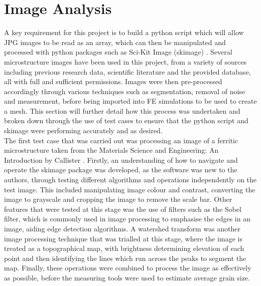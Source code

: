 \documentclass[\report.tex]{subfiles}
\begin{document}
\section{Image Analysis}
\noindent A key requirement for this project is to build a python script which will allow JPG images to be read as an array, which can then be manipulated and processed with python packages such as Sci-Kit Image (skimage) \cite{scikitimage}. Several microstructure images have been used in this project, from a variety of sources including previous research data, scientific literature and the provided database, all with full and sufficient permissions. Images were then pre-processed accordingly through various techniques such as segmentation, removal of noise and measurement, before being imported into FE simulations to be used to create a mesh. This section will further detail how this process was undertaken and broken down through the use of test cases to ensure that the python script and skimage were performing accurately and as desired.\\

\noindent The first test case that was carried out was processing an image of a ferritic microstructure taken from the Materials Science and Engineering: An Introduction by Callister \cite{CallisterJrWilliamD2000MSaE}. Firstly, an understanding of how to navigate and operate the skimage package was developed, as the software was new to the authors, through testing different algorithms and operations independently on the test image. This included manipulating image colour and contrast, converting the image to grayscale and cropping the image to remove the scale bar. Other features that were tested at this stage was the use of filters such as the Sobel filter, which is commonly used in image processing to emphasise the edges in an image, aiding edge detection algorithms. A watershed transform was another image processing technique that was trialled at this stage, where the image is treated as a topographical map, with brightness determining elevation of each point and then identifying the lines which run across the peaks to segment the map. Finally, these operations were combined to process the image as effectively as possible, before the measuring tools were used to estimate average grain size.\\

\end{document}
